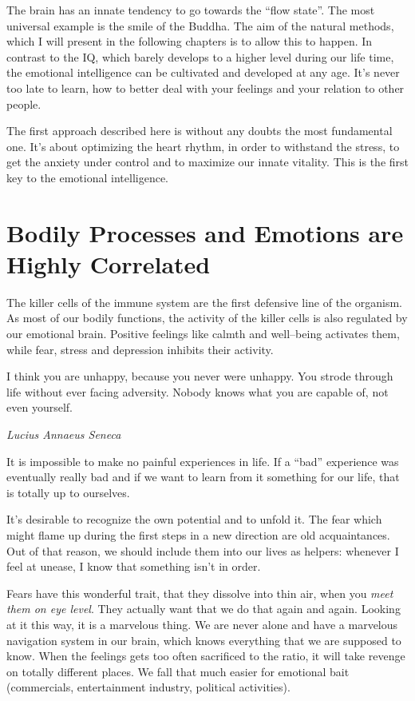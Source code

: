 \documentclass[../Book.Stress_regulation.tex]{subfiles}
\begin{document}
{  The brain has an innate tendency to go towards the ``flow state''. The most universal example is the smile of the Buddha.
  The aim of the natural methods, which I will present in the following chapters is to allow this to happen.
  In contrast to the IQ, which barely develops to a higher level during our life time, the emotional intelligence can be cultivated and developed at any age.
  It's never too late to learn, how to better deal with your feelings and your relation to other people.

  The first approach described here is without any doubts the most fundamental one.
  It's about optimizing the heart rhythm, in order to withstand the stress, to get the anxiety under control and to maximize our innate vitality.
  This is the first key to the emotional intelligence.
}

\section[Bodily Processes and Emotions]{Bodily Processes and Emotions are Highly Correlated}

The killer cells of the immune system are the first defensive line of the organism.
As most of our bodily functions, the activity of the killer cells is also regulated by our emotional brain.
Positive feelings like calmth and well--being activates them, while fear, stress and depression inhibits their activity.

\epigraph{I think you are unhappy, because you  never were unhappy. You strode through life without ever facing adversity.
  Nobody knows what you are capable of, not even yourself.}{\textit{Lucius Annaeus Seneca}}

It is impossible to make no painful experiences in life.
If a ``bad'' experience was eventually really bad and if we want to learn from it something for our life, that is totally up to ourselves.

It's desirable to recognize the own potential and to unfold it.
The fear which might flame up during the first steps in a new direction are old acquaintances.
Out of that reason, we should include them into our lives as helpers: whenever I feel at unease, I know that something isn't in order.

Fears have this wonderful trait, that they dissolve into thin air, when you \emph{meet them on eye level}.
They actually want that we do that again and again.
Looking at it this way, it is a marvelous thing.
We are never alone and have a marvelous navigation system in our brain, which knows everything that we are supposed to know.
When the feelings gets too often sacrificed to the ratio, it will take revenge on totally different places.
We fall that much easier for emotional bait (commercials, entertainment industry, political activities).
\end{document}
